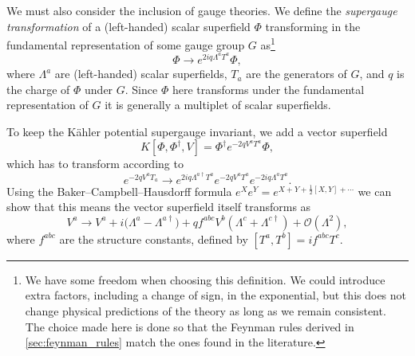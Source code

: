 We must also consider the inclusion of gauge theories.
We define the \emph{supergauge transformation} of a (left-handed) scalar superfield $\Phi$ transforming in the fundamental representation of some gauge group $G$ as\footnote{We have some freedom when choosing this definition. We could introduce extra factors, including a change of sign, in the exponential, but this does not change physical predictions of the theory as long as we remain consistent. The choice made here is done so that the Feynman rules derived in \cref{sec:feynman_rules} match the ones found in the literature.}
\begin{equation}
    \Phi \to e^{2iq\Lambda^a T^a}\Phi \label{eq:gauge_scalar},
\end{equation}
where $\Lambda^a$ are (left-handed) scalar superfields, $T_a$ are the generators of $G$, and $q$ is the charge of $\Phi$ under $G$.
Since $\Phi$ here transforms under the fundamental representation of $G$ it is generally a multiplet of scalar superfields.

To keep the K\"ahler potential supergauge invariant, we add a vector superfield
\begin{equation}
    K[\Phi,\Phi^\dagger,V] = \Phi^\dagger e^{-2qV^aT^a} \Phi,
\end{equation}
which has to transform according to
\begin{equation}
    e^{-2qV^aT_a} \to e^{2iq\Lambda^{a\dagger} T^a} e^{-2qV^a T^a} e^{-2iq\Lambda^a T^a}.
\end{equation}
Using the Baker--Campbell--Hausdorff formula $e^Xe^Y=e^{X+Y+\frac{1}{2}[X,Y] + \cdots}$ we can show that this means the vector superfield itself transforms as
\begin{equation}
    V^a \to V^a + i\bigl(\Lambda^a - \Lambda^{a\dagger} \bigr) + qf^{abc} V^b (\Lambda^c + \Lambda^{c\dagger}) + \mathcal{O}(\Lambda^2),
    \label{eq:gauge_vector}
\end{equation}
where $f^{abc}$ are the structure constants, defined by $[T^a,T^b]=if^{abc}T^c$.

